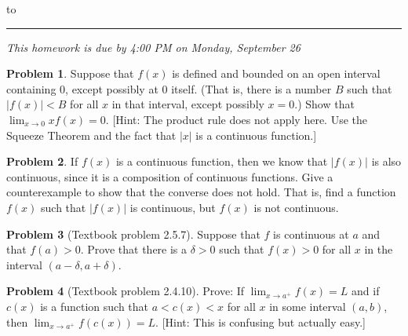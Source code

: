 \documentclass[12pt]{article}
\theoremstyle{definition}
\newtheorem{problem}{Problem}
\newenvironment{answer}{\par\medskip\bgroup\color{darkblue}}{\egroup\medskip}
\begin{document}
\hbox to 
\nointerlineskip
\vskip 2pt
\hrule height 1pt

\medskip

\centerline{\textit{This homework is due by 4:00 PM on Monday, September 26}}

\bigskip

\def\ds{\displaystyle}


\begin{problem}
Suppose that $f(x)$ is defined and bounded on an open interval containing $0$, except possibly at $0$ itself.
(That is, there is a number $B$ such that $|f(x)|<B$ for all $x$ in that interval, except possibly $x=0$.)
Show that $\ds\lim_{x\to 0}xf(x)=0$. [Hint: The product rule does not apply here.  Use the Squeeze Theorem 
and the fact that $|x|$ is a continuous function.]
\end{problem}

\begin{answer}
\end{answer}



\begin{problem}
If $f(x)$ is a continuous function, then we know that $|f(x)|$ is also continuous, since it is a 
composition of continuous functions.  Give a counterexample to show that the converse does not hold.
That is, find a function $f(x)$ such that $|f(x)|$ is continuous, but $f(x)$ is not continuous.
\end{problem}

\begin{answer}
\end{answer}



\begin{problem}[Textbook problem 2.5.7]
Suppose that $f$ is continuous at $a$ and that $f(a)>0$.  Prove that there is a $\delta>0$ such
that $f(x)>0$ for all $x$ in the interval $(a-\delta,a+\delta)$.
\end{problem}

\begin{answer}
\end{answer}



\begin{problem}[Textbook problem 2.4.10]
Prove: If $\ds\lim_{x\to a^+}f(x)=L$ and if $c(x)$ is a function such that $a<c(x)<x$ for
all $x$ in some interval $(a,b)$, then $\ds\lim_{x\to a^+}f(c(x))=L$.  [Hint: This is confusing
but actually easy.]
\end{problem}
\end{document}
